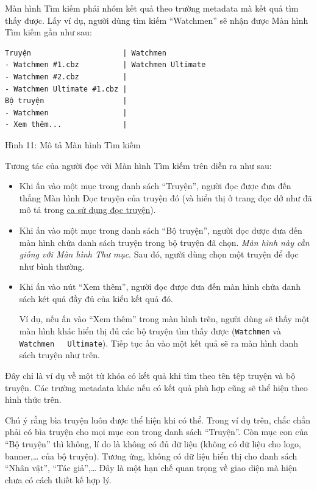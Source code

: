 \documentclass[
]{article}
\begin{document}
Màn hình Tìm kiếm phải nhóm kết quả theo trường metadata mà kết quả tìm
thấy được. Lấy ví dụ, người dùng tìm kiếm ``Watchmen'' sẽ nhận được Màn
hình Tìm kiếm gần như sau:

\begin{verbatim}
Truyện                     | Watchmen
- Watchmen #1.cbz          | Watchmen Ultimate
- Watchmen #2.cbz          |
- Watchmen Ultimate #1.cbz |
Bộ truyện                  |
- Watchmen                 |
- Xem thêm...              |
\end{verbatim}

Hình 11: Mô tả Màn hình Tìm kiếm

Tương tác của người đọc với Màn hình Tìm kiếm trên diễn ra như sau:

\begin{itemize}
\item
  Khi ấn vào một mục trong danh sách ``Truyện'', người đọc được đưa đến
  thẳng Màn hình Đọc truyện của truyện đó (và hiển thị ở trang đọc dở
  như đã mô tả trong \protect\hyperlink{P3.3.3-read-comic}{ca sử dụng
  đọc truyện}).
\item
  Khi ấn vào một mục trong danh sách ``Bộ truyện'', người đọc được đưa
  đến màn hình chứa danh sách truyện trong bộ truyện đã chọn. \emph{Màn
  hình này cần giống với Màn hình Thư mục}. Sau đó, người dùng chọn một
  truyện để đọc như bình thường.
\item
  Khi ấn vào nút ``Xem thêm'', người đọc được đưa đến màn hình chứa danh
  sách két quả đầy đủ của kiểu kết quả đó.

  Ví dụ, nếu ấn vào ``Xem thêm'' trong màn hình trên, người dùng sẽ thấy
  một màn hình khác hiển thị đủ các bộ truyện tìm thấy được
  (\texttt{Watchmen} và \texttt{Watchmen\ \ \ Ultimate}). Tiếp tục ấn
  vào một kết quả sẽ ra màn hình danh sách truyện như trên.
\end{itemize}

Đây chỉ là ví dụ về một từ khóa có kết quả khi tìm theo tên tệp truyện
và bộ truyện. Các trường metadata khác nếu có kết quả phù hợp cũng sẽ
thể hiện theo hình thức trên.

Chú ý rằng bìa truyện luôn được thể hiện khi có thể. Trong ví dụ trên,
chắc chắn phải có bìa truyện cho mọi mục con trong danh sách ``Truyện''.
Còn mục con của ``Bộ truyện'' thì không, lí do là không có đủ dữ liệu
(không có dữ liệu cho logo, banner,\ldots{} của bộ truyện). Tương ứng,
không có dữ liệu hiển thị cho danh sách ``Nhân vật'', ``Tác
giả'',\ldots{} Đây là một hạn chế quan trọng về giao diện mà hiện chưa
có cách thiết kế hợp lý.
\end{document}
